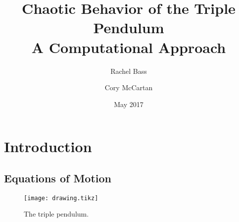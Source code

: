 \documentclass{article}
\title{Chaotic Behavior of the Triple Pendulum \\
    \large A Computational Approach }
\author{Rachel Bass \and Cory McCartan}
\date{May 2017}
\begin{document}
    \maketitle

    \section{Introduction}

    \clearpage
    \begin{appendices}

    \section{Equations of Motion}

    \begin{wrapfigure}[13]{r}{0.25\textwidth}
        \centering
        \texttt{[image: drawing.tikz]}
        \caption{The triple pendulum.}
    \end{wrapfigure}


\end{appendices}
\end{document}
